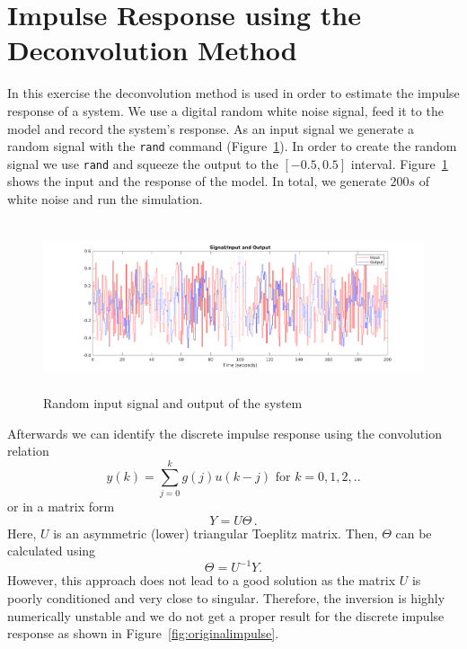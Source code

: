 \documentclass{scrartcl}
\begin{document}
\newpage
\section{Impulse Response using the Deconvolution Method}\label{section:numdec}
In this exercise the deconvolution method is used in order to estimate the impulse response of a system.
We use a digital random white noise signal, feed it to the model and record the system's response.
As an input signal we generate a random signal with the \verb|rand| command (Figure~\ref{fig:inout}).
In order to create the random signal we use \verb|rand| and squeeze the output to the $[-0.5, 0.5]$ interval.
Figure~\ref{fig:inout} shows the input and the response of the model.
In total, we generate $200s$ of white noise and run the simulation.

\begin{figure}[h]
	\centering
	\includegraphics[height=5cm]{figures/input_output.pdf}
	\caption{Random input signal and output of the system}
	\label{fig:inout}
\end{figure}
Afterwards we can identify the discrete impulse response using the convolution relation
\begin{equation}
	y(k) = \sum\limits_{j=0}^{k} g(j)u(k-j) \text{ for } k=0,1,2,.. 
\end{equation}
or in a matrix form
\begin{equation}
	Y = U \Theta\, .
\end{equation}
Here, $U$ is an asymmetric (lower) triangular Toeplitz matrix.
Then, $\Theta$ can be calculated using
\begin{equation}
	\Theta = U^{-1} Y.
\end{equation}
However, this approach does not lead to a good solution as the matrix $U$ is poorly conditioned and very close to singular.
Therefore, the inversion is highly numerically unstable and we do not get a proper result for the discrete impulse response as shown in Figure~\ref{fig:originalimpulse}.
\end{document}
